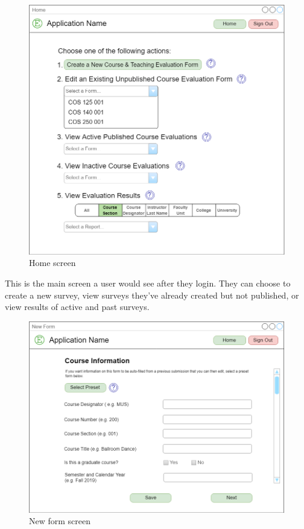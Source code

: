 \documentclass{article}
\begin{document}
\begin{center}
\begin{figure}[H]
    \centering
    \caption{Home screen}
    \includegraphics[scale=.35]{images/home_screen.png}
\end{figure}
\end{center}

This is the main screen a user would see after they login. They can choose to create a new survey, view surveys they've already created but not published, or view results of active and past surveys.

\begin{center}
\begin{figure}[H]
    \centering
    \caption{New form screen}
    \includegraphics[scale=.35]{images/create_screen.png}
\end{figure}
\end{center}
\end{document}
